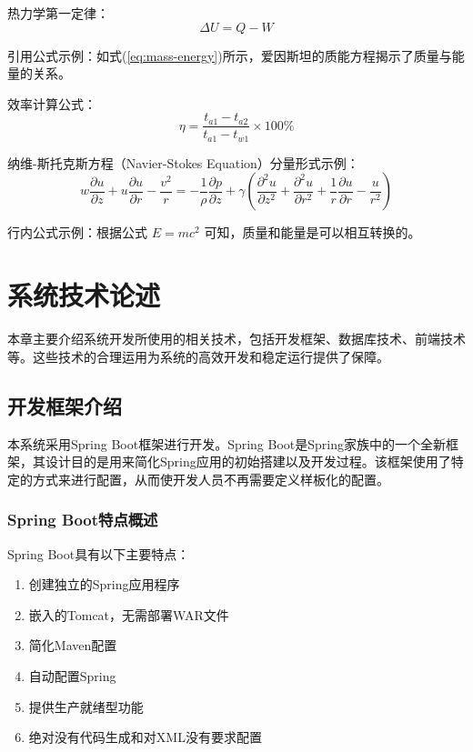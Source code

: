 \documentclass[a4paper,12pt,openany,twoside]{ctexbook}
\begin{document}
热力学第一定律：
\begin{equation}
    \Delta U = Q - W
    \label{eq:thermodynamics}
\end{equation}

引用公式示例：如式(\ref{eq:mass-energy})所示，爱因斯坦的质能方程揭示了质量与能量的关系。

效率计算公式：
\begin{equation}
    \eta = \frac{t_{a1}-t_{a2}}{t_{a1}-t_{w1}} \times 100\%
    \label{eq:efficiency}
\end{equation}

纳维-斯托克斯方程（Navier-Stokes Equation）分量形式示例：
\begin{equation}
    w\frac{\partial u}{\partial z} + u\frac{\partial u}{\partial r} - \frac{v^2}{r} = -\frac{1}{\rho}\frac{\partial p}{\partial z} + \gamma\left(\frac{\partial^2 u}{\partial z^2} + \frac{\partial^2 u}{\partial r^2} + \frac{1}{r}\frac{\partial u}{\partial r} - \frac{u}{r^2}\right)
    \label{eq:ns-equation}
\end{equation}

行内公式示例：根据公式 $E=mc^2$ 可知，质量和能量是可以相互转换的。

\chapter{系统技术论述}

本章主要介绍系统开发所使用的相关技术，包括开发框架、数据库技术、前端技术等。这些技术的合理运用为系统的高效开发和稳定运行提供了保障。

\section{开发框架介绍}

本系统采用Spring Boot框架进行开发。Spring Boot是Spring家族中的一个全新框架，其设计目的是用来简化Spring应用的初始搭建以及开发过程。该框架使用了特定的方式来进行配置，从而使开发人员不再需要定义样板化的配置。

\subsection{Spring Boot特点概述}

Spring Boot具有以下主要特点：

\begin{enumerate}[label=(\arabic*),leftmargin=2.5em,itemsep=0pt]
    \item 创建独立的Spring应用程序
    \item 嵌入的Tomcat，无需部署WAR文件
    \item 简化Maven配置
    \item 自动配置Spring
    \item 提供生产就绪型功能
    \item 绝对没有代码生成和对XML没有要求配置
\end{enumerate}
\end{document}
